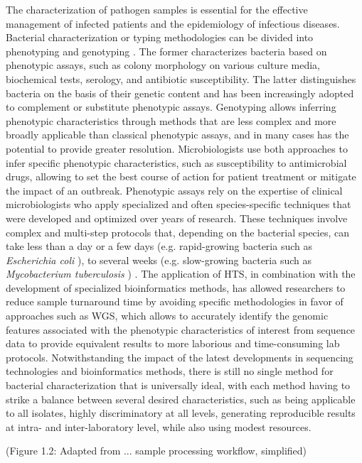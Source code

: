 The characterization of pathogen samples is essential for the effective management of infected patients and the epidemiology of infectious diseases. Bacterial characterization or typing methodologies can be divided into phenotyping and genotyping \cite{li_bacterial_2009}. The former characterizes bacteria based on phenotypic assays, such as colony morphology on various culture media, biochemical tests, serology, and antibiotic susceptibility. The latter distinguishes bacteria on the basis of their genetic content and has been increasingly adopted to complement or substitute phenotypic assays. Genotyping allows inferring phenotypic characteristics through methods that are less complex and more broadly applicable than classical phenotypic assays, and in many cases has the potential to provide greater resolution. Microbiologists use both approaches to infer specific phenotypic characteristics, such as susceptibility to antimicrobial drugs, allowing to set the best course of action for patient treatment or mitigate the impact of an outbreak. Phenotypic assays rely on the expertise of clinical microbiologists who apply specialized and often species-specific techniques that were developed and optimized over years of research. These techniques involve complex and multi-step protocols that, depending on the bacterial species, can take less than a day or a few days (e.g. rapid-growing bacteria such as \textit{Escherichia coli} \cite{son_growth_2021}), to several weeks (e.g. slow-growing bacteria such as \textit{Mycobacterium tuberculosis} \cite{gordon_microbe_2018}) \cite{didelot_transforming_2012}. The application of \ac{HTS}, in combination with the development of specialized bioinformatics methods, has allowed researchers to reduce sample turnaround time by avoiding specific methodologies in favor of approaches such as \ac{WGS}, which allows to accurately identify the genomic features associated with the phenotypic characteristics of interest from sequence data to provide equivalent results to more laborious and time-consuming lab protocols. Notwithstanding the impact of the latest developments in sequencing technologies and bioinformatics methods, there is still no single method for bacterial characterization that is universally ideal, with each method having to strike a balance between several desired characteristics, such as being applicable to all isolates, highly discriminatory at all levels, generating reproducible results at intra- and inter-laboratory level, while also using modest resources.

(Figure 1.2: Adapted from ... sample processing workflow, simplified)

